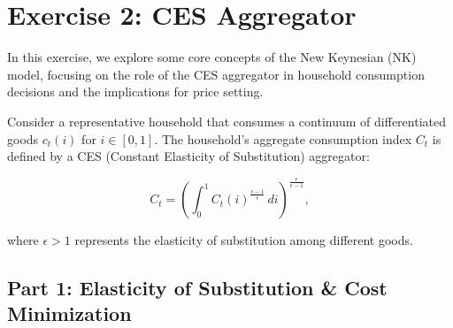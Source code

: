 \documentclass[a4paper,11pt]{article}
\begin{document}
% 

\section*{Exercise 2: CES Aggregator}

In this exercise, we explore some core concepts of the New Keynesian (NK) model, focusing on the role of the CES aggregator in household consumption decisions and the implications for price setting. 

Consider a representative household that consumes a continuum of differentiated goods \( c_t(i) \) for \( i \in [0,1] \). The household's aggregate consumption index \( C_t \) is defined by a CES (Constant Elasticity of Substitution) aggregator:

\begin{equation}\label{eq:coba}
C_t = \left( \int_0^1 C_t(i)^{\frac{\epsilon - 1}{\epsilon}} \, di \right)^{\frac{\epsilon}{\epsilon - 1}},
\end{equation}

where \( \epsilon > 1 \) represents the elasticity of substitution among different goods.

\subsection*{Part 1: Elasticity of Substitution \& Cost Minimization}
\end{document}
